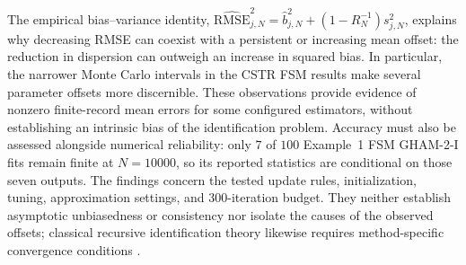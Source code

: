 The empirical bias--variance identity,
$\widehat{\mathrm{RMSE}}_{j,N}^{2}
=\widehat b_{j,N}^{2}+(1-R_N^{-1})s_{j,N}^{2}$,
explains why decreasing RMSE can coexist with a persistent or increasing
mean offset: the reduction in dispersion can outweigh an increase in
squared bias. In particular, the narrower Monte Carlo intervals in the
CSTR FSM results make several parameter offsets more discernible.
These observations provide evidence of nonzero finite-record mean errors
for some configured estimators, without establishing an intrinsic bias
of the identification problem. Accuracy must also be assessed alongside
numerical reliability: only $7$ of $100$ Example~1 FSM GHAM-2-I fits
remain finite at $N=10000$, so its reported statistics are conditional
on those seven outputs. The findings concern the tested update rules,
initialization, tuning, approximation settings, and $300$-iteration
budget. They neither establish asymptotic unbiasedness or consistency
nor isolate the causes of the observed offsets; classical recursive
identification theory likewise requires method-specific convergence
conditions \cite{SoderstromLjungGustavsson1978,Ljung1981}.

